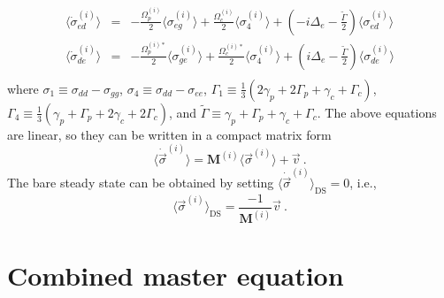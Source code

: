 \documentclass[aps, pra, reprint, amsmath, amssymb, groupedaddress, acknowledgments]{revtex4-1}
\begin{document}
\begin{eqnarray}
\langle\dot{\sigma}^{(i)}_{ed}\rangle &=& -\frac{\Omega_p^{(i)}}{2}  \langle\sigma^{(i)}_{eg}\rangle +  \frac{\Omega_c^{(i)}}{2} \langle\sigma^{(i)}_{4}\rangle + (-i \Delta_e - \frac{\tilde{\Gamma}}{2}) \langle\sigma^{(i)}_{ed}\rangle \nonumber \\
\langle\dot{\sigma}^{(i)}_{de}\rangle &=& -\frac{\Omega_p^{(i)\ast}}{2}  \langle\sigma^{(i)}_{ge}\rangle +  \frac{\Omega_c^{(i)\ast}}{2} \langle\sigma^{(i)}_{4}\rangle + (i \Delta_e - \frac{\tilde{\Gamma}}{2}) \langle\sigma^{(i)}_{de}\rangle \nonumber \\
\end{eqnarray}
where $\sigma_1 \equiv \sigma_{dd}-\sigma_{gg}$, $\sigma_4 \equiv \sigma_{dd}-\sigma_{ee}$, $\Gamma_1 \equiv \frac{1}{3} (2\gamma_p+2\Gamma_p+\gamma_c+\Gamma_c)$, $\Gamma_4 \equiv \frac{1}{3} (\gamma_p+\Gamma_p+2\gamma_c+2\Gamma_c)$, and $\tilde{\Gamma}\equiv \gamma_p + \Gamma_p + \gamma_c + \Gamma_c$.  The above equations are linear, so they can be written in a compact matrix form 
\begin{equation}
\langle \dot{\vec{\sigma}}^{(i)} \rangle = \mathbf{M}^{(i)} \langle \vec{\sigma}^{(i)} \rangle +\vec{v}~.
\end{equation}
The bare steady state can be obtained by setting $\langle \dot{\vec{\sigma}}^{(i)} \rangle_\textrm{DS}=0 $, i.e., 
\begin{equation}
\langle\vec{\sigma}^{(i)}\rangle_\textrm{DS} = \frac{-1}{\mathbf{M}^{(i)} } \vec{v}~.
\end{equation}


\section{Combined master equation \label{app:combine}}
\end{document}
